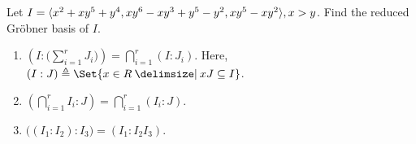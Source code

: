 \begin{exercise}
  Let $I = \langle x^2+xy^5+y^4, xy^6-xy^3+y^5-y^2, xy^5-xy^2\rangle, x > y$.
  Find the reduced Gr\"obner basis of $I$.
\end{exercise}

\begin{exercise} \mbox{}
  \begin{enumerate}
    \item $\left( I : \big( \sum\limits_{i=1}^r J_i \big) \right)
      = \bigcap\limits_{i=1}^r (I: J_i)$.
      Here, $(I:J) \triangleq \Set{ x\in R \given xJ \subseteq I }$.
    \item $\left( \bigcap\limits_{i=1}^r I_i : J \right) =
      \bigcap\limits_{i=1}^r \left( I_i : J \right)$.
    \item $\big((I_1 : I_2) : I_3 \big) = (I_1 : I_2 I_3)$.
  \end{enumerate}
\end{exercise}
